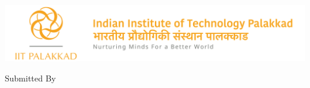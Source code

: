 \begin{titlepage}
  \begin{center}
      \vspace*{1cm}

      \includegraphics[width=\textwidth]{images/IIT_PALAKKAD_LOGO.png}
      
      \vfill

      \Huge
      
      
      \textbf{\papertitle}
      
      \vfill
      
      \Large
      Submitted By\\
      \textbf{\authorname}

      \vspace{1.5cm}

      \large
      \acmodulecode\ \textsc{\acmodulename}
      
      \vspace{0.7cm}
      
      \large
      \textsc{\accollegename}
      
      \vspace{0.7cm}
      
      \Large
      \wrdate
      
  \end{center}
\end{titlepage}
